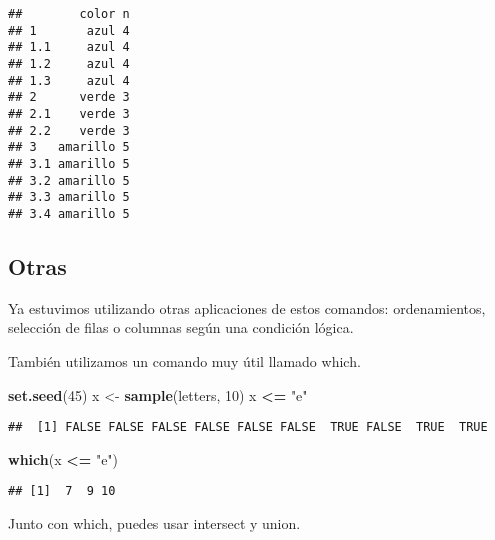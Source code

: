 \documentclass[]{article}
\newenvironment{Shaded}{\begin{snugshade}}{\end{snugshade}}
\newcommand{\KeywordTok}[1]{\textcolor[rgb]{0.13,0.29,0.53}{\textbf{#1}}}
\newcommand{\DecValTok}[1]{\textcolor[rgb]{0.00,0.00,0.81}{#1}}
\newcommand{\StringTok}[1]{\textcolor[rgb]{0.31,0.60,0.02}{#1}}
\newcommand{\OperatorTok}[1]{\textcolor[rgb]{0.81,0.36,0.00}{\textbf{#1}}}
\newcommand{\NormalTok}[1]{#1}
\begin{document}
\begin{verbatim}
##        color n
## 1       azul 4
## 1.1     azul 4
## 1.2     azul 4
## 1.3     azul 4
## 2      verde 3
## 2.1    verde 3
## 2.2    verde 3
## 3   amarillo 5
## 3.1 amarillo 5
## 3.2 amarillo 5
## 3.3 amarillo 5
## 3.4 amarillo 5
\end{verbatim}

\subsection{Otras}\label{otras}

Ya estuvimos utilizando otras aplicaciones de estos comandos:
ordenamientos, selección de filas o columnas según una condición lógica.

También utilizamos un comando muy útil llamado which.

\begin{Shaded}
\begin{Highlighting}[]
\KeywordTok{set.seed}\NormalTok{(}\DecValTok{45}\NormalTok{)}
\NormalTok{x <-}\StringTok{ }\KeywordTok{sample}\NormalTok{(letters, }\DecValTok{10}\NormalTok{)}
\NormalTok{x }\OperatorTok{<=}\StringTok{ "e"}
\end{Highlighting}
\end{Shaded}

\begin{verbatim}
##  [1] FALSE FALSE FALSE FALSE FALSE FALSE  TRUE FALSE  TRUE  TRUE
\end{verbatim}

\begin{Shaded}
\begin{Highlighting}[]
\KeywordTok{which}\NormalTok{(x }\OperatorTok{<=}\StringTok{ "e"}\NormalTok{)}
\end{Highlighting}
\end{Shaded}

\begin{verbatim}
## [1]  7  9 10
\end{verbatim}

Junto con which, puedes usar intersect y union.
\end{document}
